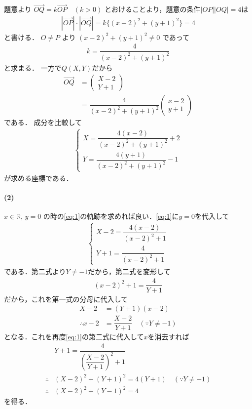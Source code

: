 \documentclass[../../main.tex]{subfiles}
\begin{document}
題意より $\overrightarrow{OQ} = k\overrightarrow{OP} \quad (k>0)$ とおけることより，題意の条件$|OP||OQ|=4$は
\begin{align}
  |\overrightarrow{OP}| \cdot |\overrightarrow{OQ}| = k \{ (x-2)^2+(y+1)^2 \} = 4
\end{align}
と書ける．
$O \ne P$ より $(x-2)^2+(y+1)^2\neq 0$ であって
\begin{align}
  k = \dfrac{4}{(x-2)^2+(y+1)^2}
\end{align}
と求まる．
一方で$Q(X,Y)$だから
\begin{align}
  \overrightarrow{OQ}
  &=
  \begin{pmatrix} X-2 \\ Y+1
  \end{pmatrix} \\
  &= \dfrac{4}{(x-2)^2+(y+1)^2}
  \begin{pmatrix} x-2 \\ y+1
  \end{pmatrix}
\end{align}
である．
成分を比較して
\begin{align}
  \begin{cases}
    X = \dfrac{4(x-2)}{(x-2)^2+(y+1)^2} + 2 \\
    Y = \dfrac{4(y+1)}{(x-2)^2+(y+1)^2} - 1
  \end{cases} \label{eq:1}
\end{align}
が求める座標である．

\paragraph{(2)}
$x \in \mathbb{R}, \, y=0$ の時の\cref{eq:1}の軌跡を求めれば良い．\cref{eq:1}に$y=0$を代入して
\begin{align}
  \begin{cases}
    X-2 = \dfrac{4(x-2)}{(x-2)^2+1} \\
    Y+1 = \dfrac{4}{(x-2)^2+1}
  \end{cases} \label{eq:2}
\end{align}
である．第二式より$Y \ne -1$だから，第二式を変形して
\begin{align}
  (x-2)^2+1 = \dfrac{4}{Y+1}
\end{align}
だから，これを第一式の分母に代入して
\begin{align}
  X-2 &= (Y+1)(x-2) \\
  \therefore
  x-2 &= \dfrac{X-2}{Y+1} \quad (\because Y \ne -1)
\end{align}
となる．これを再度\cref{eq:1}の第二式に代入して$x$を消去すれば
\begin{align}
  &  Y+1 = \dfrac{4}{\left( \dfrac{X-2}{Y+1} \right)^2 + 1}  \\
  \therefore
  & (X-2)^2 + (Y+1)^2 = 4(Y+1) \quad (\because Y \ne -1) \\
  \therefore
  & (X-2)^2 + (Y-1)^2 = 4 \label{eq:3}
\end{align}
を得る．
\end{document}
